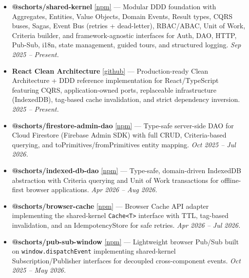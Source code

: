 \documentclass[10.5pt,a4paper]{article}
\begin{document}
\begin{itemize}
  \item \textbf{@schorts/shared-kernel}
        \href{https://www.npmjs.com/package/@schorts/shared-kernel}{\small\color{muted}[npm]}
        --- Modular DDD foundation with Aggregates, Entities, Value Objects, Domain Events,
        Result types, CQRS buses, Sagas, Event Bus (retries + dead-letter), RBAC/ABAC,
        Unit of Work, Criteria builder, and framework-agnostic interfaces for Auth, DAO,
        HTTP, Pub-Sub, i18n, state management, guided tours, and structured logging.
        \textit{Sep 2025 -- Present.}

  \item \textbf{React Clean Architecture}
        \href{https://github.com/schorts99/react-clean-architecture}{\small\color{muted}[github]}
        --- Production-ready Clean Architecture + DDD reference implementation for
        React/TypeScript featuring CQRS, application-owned ports, replaceable infrastructure
        (IndexedDB), tag-based cache invalidation, and strict dependency inversion.
        \textit{2025 -- Present.}

  \item \textbf{@schorts/firestore-admin-dao}
        \href{https://www.npmjs.com/package/@schorts/firestore-admin-dao}{\small\color{muted}[npm]}
        --- Type-safe server-side DAO for Cloud Firestore (Firebase Admin SDK) with full
        CRUD, Criteria-based querying, and toPrimitives/fromPrimitives entity mapping.
        \textit{Oct 2025 -- Jul 2026.}

  \item \textbf{@schorts/indexed-db-dao}
        \href{https://www.npmjs.com/package/@schorts/indexed-db-dao}{\small\color{muted}[npm]}
        --- Type-safe, domain-driven IndexedDB abstraction with Criteria querying and Unit
        of Work transactions for offline-first browser applications.
        \textit{Apr 2026 -- Aug 2026.}

  \item \textbf{@schorts/browser-cache}
        \href{https://www.npmjs.com/package/@schorts/browser-cache}{\small\color{muted}[npm]}
        --- Browser Cache API adapter implementing the shared-kernel \texttt{Cache<T>}
        interface with TTL, tag-based invalidation, and an IdempotencyStore for safe retries.
        \textit{Apr 2026 -- Jul 2026.}

  \item \textbf{@schorts/pub-sub-window}
        \href{https://www.npmjs.com/package/@schorts/pub-sub-window}{\small\color{muted}[npm]}
        --- Lightweight browser Pub/Sub built on \texttt{window.dispatchEvent} implementing
        shared-kernel Subscription/Publisher interfaces for decoupled cross-component events.
        \textit{Oct 2025 -- May 2026.}


\end{itemize}
\end{document}
